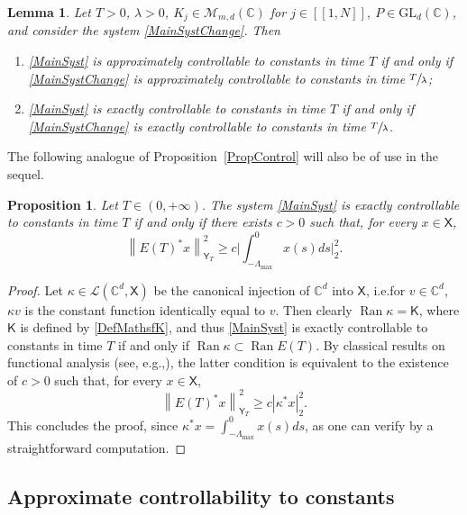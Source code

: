 \documentclass[10pt]{amsart}
\providecommand{\eg}{}
\renewcommand{\eg}{e.g.,\xspace}
\newcommand{\llbracket}{[\![}
\newcommand{\rrbracket}{]\!]}
\theoremstyle{plain}
\newtheorem{lemm}[theo]{Lemma}
\newtheorem{prop}[theo]{Proposition}
\theoremstyle{definition}
\DeclareMathOperator{\range}{Ran}
\newcommand{\norm}[1]{\left\lVert #1\right\lVert}
\newcommand{\abs}[1]{\left\lvert #1\right \rvert}
\newcommand{\bgabs}[1]{\biggl\lvert #1\biggr \rvert}
\providecommand{\ie}{i.e.}\providecommand{\etc}{etc.}\providecommand{\resp}{resp.}\providecommand{\cf}{cf.}
\begin{document}
\begin{lemm}
\label{LemmInvariantConstants}
Let $T > 0$, $\lambda > 0$, $K_j \in \mathcal M_{m, d}(\mathbb C)$ for $j \in \llbracket 1, N\rrbracket$, $P \in \mathrm{GL}_d(\mathbb C)$, and consider the system \eqref{MainSystChange}. Then
\begin{enumerate}
\item\label{ApproxContrlConstIff} \eqref{MainSyst} is approximately controllable to constants in time $T$ if and only if \eqref{MainSystChange} is approximately controllable to constants in time $\sfrac{T}{\lambda}$;

\item\label{ExactContrlConstIff} \eqref{MainSyst} is exactly controllable to constants in time $T$ if and only if \eqref{MainSystChange} is exactly controllable to constants in time $\sfrac{T}{\lambda}$.
\end{enumerate}
\end{lemm}

The following analogue of Proposition~\ref{PropControl} will also be of use in the sequel.

\begin{prop}
\label{PropInegObservConst}
Let $T \in (0, +\infty)$. The system \eqref{MainSyst} is exactly controllable to constants in time $T$ if and only if there exists $c > 0$ such that, for every $x \in \mathsf X$,
\[
\norm{E(T)^\ast x}_{\mathsf Y_T}^2 \geq c \bgabs{\int_{-\Lambda_{\max}}^0 x(s) ds}_2^2.
\]
\end{prop}

\begin{proof}
Let $\kappa \in \mathcal L(\mathbb C^d, \mathsf X)$ be the canonical injection of $\mathbb C^d$ into $\mathsf X$, \ie for $v \in \mathbb C^d$, $\kappa v$ is the constant function identically equal to $v$. Then clearly $\range \kappa = \mathsf K$, where $\mathsf K$ is defined by \eqref{DefMathsfK}, and thus \eqref{MainSyst} is exactly controllable to constants in time $T$ if and only if $\range \kappa \subset \range E(T)$. By classical results on functional analysis (see, \eg \cite[Lem.\,2.48]{Coron2007Control}), the latter condition is equivalent to the existence of $c > 0$ such that, for every $x \in \mathsf X$,
\[
\norm{E(T)^\ast x}_{\mathsf Y_T}^2 \geq c \abs{\kappa^\ast x}_2^2.
\]
This concludes the proof, since $\kappa^\ast x = \int_{-\Lambda_{\max}}^0 x(s) ds$, as one can verify by a straightforward computation.
\end{proof}

\subsection{Approximate controllability to constants}
\label{SecApproxToConst}
\end{document}
